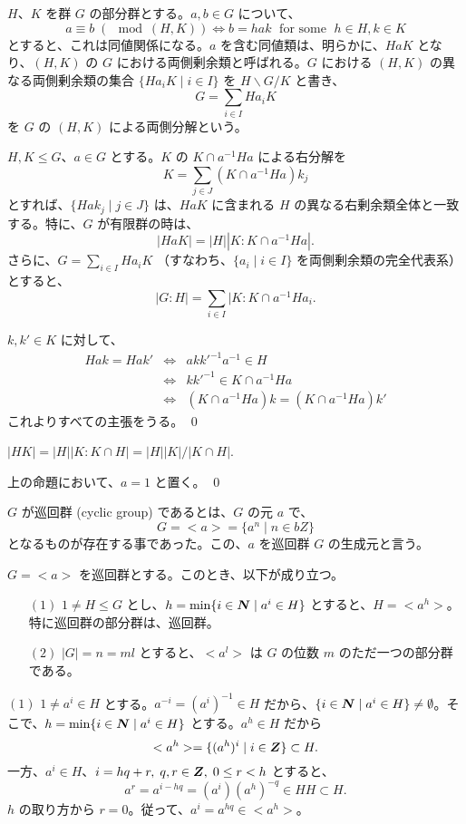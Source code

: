 \medskip
$H$、$K$ を群 $G$ の部分群とする。$a, b\in G$ について、
$$a\equiv b\; (\mod (H,K)) \Leftrightarrow b = hak \;\mbox{ for some }\;h\in H, k\in K$$
とすると、これは同値関係になる。$a$ を含む同値類は、明らかに、$HaK$ となり、$(H,K)$ の $G$ における両側剰余類と呼ばれる。$G$ における $(H,K)$ の異なる両側剰余類の集合 $\{Ha_iK\mid i\in I\}$ を $H\backslash G/K$ と書き、
$$G = \sum_{i\in I}Ha_iK$$
を $G$ の $(H,K)$ による両側分解という。

\begin{prop} \label{prop:double-coset}
$H, K\leq G$、$a\in G$ とする。$K$ の $K\cap a^{-1}Ha$  による右分解を
$$K = \sum_{j\in J}(K\cap a^{-1}Ha)k_j$$
とすれば、$\{Hak_j\mid j\in J\}$ は、$HaK$ に含まれる $H$ の異なる右剰余類全体と一致する。特に、$G$ が有限群の時は、
$$|HaK| = |H||K:K\cap a^{-1}Ha|.$$
さらに、$G = \sum_{i\in I}Ha_iK$ （すなわち、$\{a_i\mid i\in I\}$ を両側剰余類の完全代表系）とすると、
$$|G:H| = \sum_{i\in I}|K:K\cap a^{-1}Ha_i.$$
\end{prop}
\proof
$k, k'\in K$ に対して、
\begin{eqnarray*}
Hak = Hak' & \Leftrightarrow & akk'^{-1}a^{-1}\in H\\
	&\Leftrightarrow& kk'^{-1}\in K\cap a^{-1}Ha\\
	&\Leftrightarrow& (K\cap a^{-1}Ha)k = (K\cap a^{-1}Ha)k'
\end{eqnarray*}
これよりすべての主張をうる。
\qed

\begin{cor}
$|HK| = |H||K:K\cap H| = |H||K|/|K\cap H|$.
\end{cor}
\proof
上の命題において、$a = 1$ と置く。
\qed

\newpage
{}
$G$ が巡回群 (cyclic group) であるとは、$G$ の元 $a$ で、
$$G = <a> = \{a^n\mid n\in bZ\}$$
となるものが存在する事であった。この、$a$ を巡回群 $G$ の生成元と言う。

\begin{thm} \label{thm:cyclic:subgroup}
$G = <a>$  を巡回群とする。このとき、以下が成り立つ。
\begin{itemize}
\item[$(1)$] $1 \neq H\leq G$  とし、$h = \min\{i\in \mbox{\boldmath $N$}\mid a^i\in H\}$ とすると、$H = <a^h>$。特に巡回群の部分群は、巡回群。
\item[$(2)$] $|G| = n = ml$ とすると、$<a^l>$ は $G$ の位数 $m$ のただ一つの部分群である。
\end{itemize}
\end{thm}
\proof
$(1)$ $1\neq a^i\in H$ とする。$a^{-i} = (a^i)^{-1}\in H$ だから、$\{i\in\mbox{\boldmath $N$}\mid a^i\in H\}\neq \emptyset$。そこで、$h = \min\{i\in \mbox{\boldmath $N$} \mid a^i\in H\}$ とする。$a^h\in H$ だから
$$<a^h> = \{(a^h)^i\mid i\in\mbox{\boldmath $Z$}\}\subset H.$$
一方、$a^i\in H$、$i = hq + r,\;q,r\in \mbox{\boldmath $Z$},\;0\leq r<h$ とすると、
$$a^r = a^{i-hq} = (a^i)(a^h)^{-q}\in HH\subset H.$$
$h$ の取り方から $r = 0$。従って、$a^i = a^{hq} \in <a^h>$。

